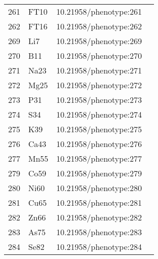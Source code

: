 \begin{longtable}{p{} p{} p{} p{}}
 261 & FT10 & 10.21958/phenotype:261 &\cite{1001genome}\\
 262 & FT16 & 10.21958/phenotype:262 &\cite{1001genome}\\
 269 & Li7 & 10.21958/phenotype:269 & \cite{ion2015}\\
 270 & B11 & 10.21958/phenotype:270 & \cite{ion2015}\\
 271 & Na23 & 10.21958/phenotype:271 & \cite{ion2015}\\
 272 & Mg25 & 10.21958/phenotype:272 & \cite{ion2015}\\
 273 & P31 & 10.21958/phenotype:273 & \cite{ion2015}\\
 274 & S34 & 10.21958/phenotype:274 & \cite{ion2015}\\
 275 & K39 & 10.21958/phenotype:275 & \cite{ion2015}\\
 276 & Ca43 & 10.21958/phenotype:276 & \cite{ion2015}\\
 277 & Mn55 & 10.21958/phenotype:277 & \cite{ion2015}\\
 279 & Co59 & 10.21958/phenotype:279 & \cite{ion2015}\\
 280 & Ni60 & 10.21958/phenotype:280 & \cite{ion2015}\\
 281 & Cu65 & 10.21958/phenotype:281 & \cite{ion2015}\\
 282 & Zn66 & 10.21958/phenotype:282 & \cite{ion2015}\\
 283 & As75 & 10.21958/phenotype:283 & \cite{ion2015}\\
 284 & Se82 & 10.21958/phenotype:284 & \cite{ion2015}\\
\bottomrule
\end{longtable}
